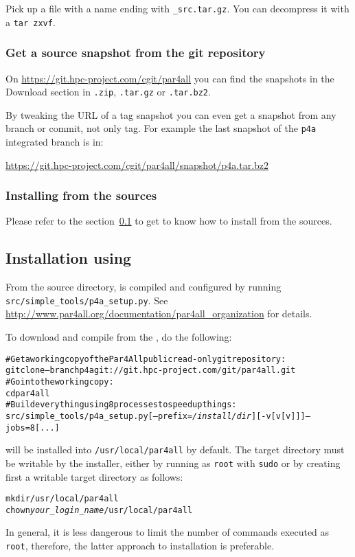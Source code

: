 \documentclass[a4paper]{article}
\begin{document}
Pick up a file with a name ending with \texttt{\_src.tar.gz}. You can
decompress it with a \texttt{tar zxvf}.


\subsubsection{Get a source snapshot from the git repository}

On \url{https://git.hpc-project.com/cgit/par4all} you can find the
snapshots in the Download section in \texttt{.zip}, \texttt{.tar.gz} or
\texttt{.tar.bz2}.

By tweaking the URL of a tag snapshot you can even get a snapshot from any
branch or commit, not only tag. For example the last snapshot of the
\texttt{p4a} integrated branch is in:

\url{https://git.hpc-project.com/cgit/par4all/snapshot/p4a.tar.bz2}


\subsubsection{Installing from the sources}
Please refer to the section~\ref{sec:installation_using git} to get to
know how to install \Apfa from the sources.


\subsection{Installation using \protect\Agit}
\label{sec:installation_using git}

From the \Apfa source directory, \Apfa is compiled and configured
by running \verb|src/simple_tools/p4a_setup.py|. See
\url{http://www.par4all.org/documentation/par4all_organization} for details.

To download and compile \Apfa from the \Agit, do the following:
\begin{alltt}
# Get a working copy of the Par4All public read-only git repository:
git clone --branch p4a git://git.hpc-project.com/git/par4all.git
# Go into the working copy:
cd par4all
# Build everything using 8 processes to speed up things:
src/simple_tools/p4a_setup.py [--prefix=\emph{/install/dir}] [-v[v[v]]] --jobs=8 [...]
\end{alltt}%

\Apfa will be installed into \verb|/usr/local/par4all| by default.
The target directory must be writable by the installer, either by running
as \texttt{root} with \texttt{sudo} or by creating first a
writable target directory as follows:
\begin{alltt}
mkdir /usr/local/par4all
chown \emph{your_login_name} /usr/local/par4all
\end{alltt}
In general, it is less dangerous to limit the number of commands
executed as \texttt{root}, therefore, the latter approach to \Apfa
installation is preferable.
\end{document}
